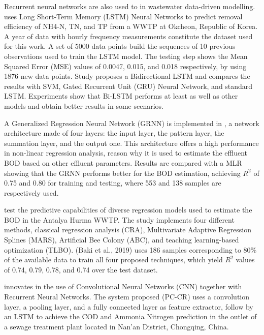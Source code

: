 Recurrent neural networks are also used to in wastewater data-driven modelling. \cite{Yaqub2020} uses Long Short-Term Memory (LSTM) Neural Networks to predict removal efficiency of NH4-N, TN, and TP from a WWTP at Okcheon, Republic of Korea. A year of data with hourly frequency measurements constitute the dataset used for this work. A set of 5000 data points build the sequences of 10 previous observations used to train the LSTM model. The testing step shows the Mean Squared Error (MSE) values of 0.0047, 0.015, and 0.018 respectively, by using 1876 new data points. Study \cite{Kang2020} proposes a Bidirectional LSTM and compares the results with SVM, Gated Recurrent Unit (GRU) Neural Network, and standard LSTM. Experiments show that Bi-LSTM performs at least as well as other models and obtain better results in some scenarios.

A Generalized Regression Neural Network (GRNN) is implemented in \cite{Heddam2016}, a network architecture made of four layers: the input layer, the pattern layer, the summation layer, and the output one. This architecture offers a high performance in non-linear regression analysis, reason why it is used to estimate the effluent BOD based on other effluent parameters. Results are compared with a MLR showing that the GRNN performs better for the BOD estimation, achieving \begin{math}R^2\end{math} of 0.75 and 0.80 for training and testing, where 553 and 138 samples are respectively used. 

\cite{Baki2019} test the predictive capabilities of diverse regression models used to estimate the BOD in the Antalya Hurma WWTP. The study implements four different methods, classical regression analysis (CRA), Multivariate Adaptive Regression Splines (MARS), Artificial Bee Colony (ABC), and teaching learning-based optimization (TLBO). (Baki et al., 2019) uses 186 samples corresponding to 80\% of the available data to train all four proposed techniques, which yield \begin{math}R^2\end{math} values of 0.74, 0.79, 0.78, and 0.74 over the test dataset.

\cite{Guo2020} innovates in the use of Convolutional Neural Networks (CNN) together with Recurrent Neural Networks. The system proposed (PC-CR) uses a convolution layer, a pooling layer, and a fully connected layer as feature extractor, follow by an LSTM to achieve the \ac{COD} and Ammonia Nitrogen prediction in the outlet of a sewage treatment plant located in Nan'an District, Chongqing, China.

